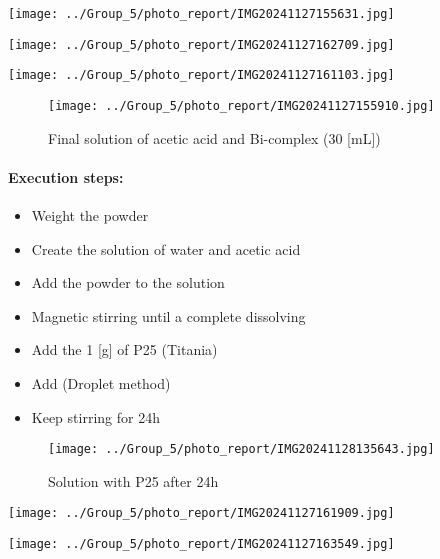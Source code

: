 \begin{minipage}{0.32\textwidth}
    \centering
    \texttt{[image: ../Group\_5/photo\_report/IMG20241127155631.jpg]}
\end{minipage}%
\begin{minipage}{0.32\textwidth}
    \centering
    \texttt{[image: ../Group\_5/photo\_report/IMG20241127162709.jpg]}
\end{minipage}%
\begin{minipage}{0.32\textwidth}
    \centering
    \texttt{[image: ../Group\_5/photo\_report/IMG20241127161103.jpg]}
\end{minipage}

\begin{figure}[ht]
    \centering
	\texttt{[image: ../Group\_5/photo\_report/IMG20241127155910.jpg]}
    \caption{Final solution of acetic acid and Bi-complex (30 [mL])}
\end{figure}

\newpage

\paragraph{Execution steps:}

\begin{itemize}
    \item Weight the powder
    \item Create the solution of water and acetic acid
    \item Add the powder to the solution
    \item Magnetic stirring until a complete dissolving
    \item Add the 1 [g] of P25 (Titania)
    \item Add  (Droplet method) 
    \item Keep stirring for 24h
\end{itemize}

\begin{figure}[ht]
    \centering
	\texttt{[image: ../Group\_5/photo\_report/IMG20241128135643.jpg]}
    \caption{Solution with P25 after 24h}
\end{figure}

\begin{minipage}{0.48\textwidth}
    \centering
    \texttt{[image: ../Group\_5/photo\_report/IMG20241127161909.jpg]}
\end{minipage}%
\begin{minipage}{0.48\textwidth}
    \centering
    \texttt{[image: ../Group\_5/photo\_report/IMG20241127163549.jpg]}
\end{minipage}

